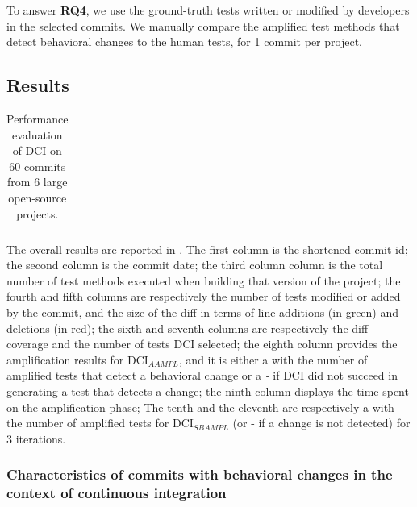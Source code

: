 To answer \textbf{RQ4}, we use the ground-truth tests written or modified by developers in the selected commits. %
We manually compare the amplified test methods that detect behavioral changes to the human tests, for 1 commit per project.

\subsection{Results}
\label{subsec:result}
\begin{table}
\centering
\small
\def\arraystretch{0.3}%
\setlength\tabcolsep{.35pt} %
\caption{Performance evaluation of DCI on 60 commits from 6 large open-source projects.}
\label{tab:overall_result}
\begin{tabular}{l|c|rcccc|c|cc|cc|cc|cc}

\end{tabular}
\end{table}

The overall results are reported in .
The first column is the shortened commit id;
the second column is the commit date;
the third column column is the total number of test methods executed when building that version of the project;
the fourth and fifth columns are respectively the number of tests modified or added by the commit, and the size of the diff in terms of line additions (in green) and deletions (in red);
the sixth and seventh columns are respectively the diff coverage and the number of tests DCI selected;
the eighth column provides the amplification results for DCI$_{AAMPL}$, and it is either a \cmark with the number of amplified tests that detect a behavioral change or a \textit{-} if DCI did not succeed in generating a test that detects a change;
the ninth column displays the time spent on the amplification phase;
The tenth and the eleventh are respectively a \cmark with the number of amplified tests for DCI$_{SBAMPL}$  (or - if a change is not detected) for 3 iterations.

\subsubsection{Characteristics of commits with behavioral changes in the context of continuous integration}
\label{subsubsec:answerq1}

